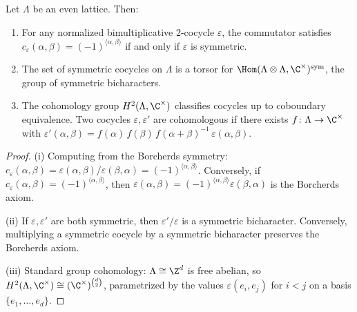 \begin{lemma}\label{lem:lattice:cocycle-class}
Let $\Lambda$ be an even lattice. Then:
\begin{enumerate}[label=(\roman*)]
\item For any normalized bimultiplicative 2-cocycle $\varepsilon$, the
 commutator satisfies
 $c_\varepsilon(\alpha, \beta) = (-1)^{\langle\alpha,\beta\rangle}$
 if and only if $\varepsilon$ is symmetric.
\item The set of symmetric cocycles on $\Lambda$ is a torsor for
 $\Hom(\Lambda \otimes \Lambda, \C^\times)^{\text{sym}}$, the group of
 symmetric bicharacters.
\item The cohomology group $H^2(\Lambda, \C^\times)$ classifies
 cocycles up to coboundary equivalence. Two cocycles
 $\varepsilon, \varepsilon'$ are cohomologous if there exists
 $f \colon \Lambda \to \C^\times$ with
 $\varepsilon'(\alpha,\beta) =
 f(\alpha)\,f(\beta)\,f(\alpha+\beta)^{-1}\,\varepsilon(\alpha,\beta)$.
\end{enumerate}
\end{lemma}

\begin{proof}
(i) Computing from the Borcherds symmetry:
$c_\varepsilon(\alpha,\beta) =
\varepsilon(\alpha,\beta)/\varepsilon(\beta,\alpha) =
(-1)^{\langle\alpha,\beta\rangle}$.
Conversely, if $c_\varepsilon(\alpha,\beta) =
(-1)^{\langle\alpha,\beta\rangle}$, then
$\varepsilon(\alpha,\beta) =
(-1)^{\langle\alpha,\beta\rangle}\varepsilon(\beta,\alpha)$
is the Borcherds axiom.

(ii) If $\varepsilon, \varepsilon'$ are both symmetric, then
$\varepsilon'/\varepsilon$ is a symmetric bicharacter. Conversely,
multiplying a symmetric cocycle by a symmetric bicharacter preserves
the Borcherds axiom.

(iii) Standard group cohomology: $\Lambda \cong \Z^d$ is free abelian,
so $H^2(\Lambda, \C^\times) \cong (\C^\times)^{\binom{d}{2}}$,
parametrized by the values $\varepsilon(e_i, e_j)$ for $i < j$ on a
basis $\{e_1, \ldots, e_d\}$.
\end{proof}

